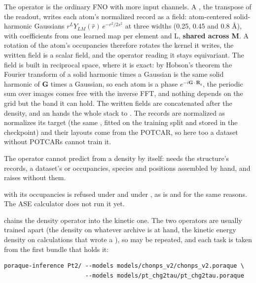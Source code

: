 The operator is the ordinary FNO with more input channels. A , the transpose of the  readout, writes each atom's normalized record as a field: atom-centered solid-harmonic Gaussians $r^L Y_{LM}(\hat r)\,e^{-r^2/2s^2}$ at three widths (0.25, 0.45 and 0.8 \AA{}), with coefficients from one learned map per element and L, \textbf{shared across M}. A rotation of the atom's occupancies therefore rotates the kernel it writes, the written field is a scalar field, and the operator reading it stays equivariant. The field is built in reciprocal space, where it is exact: by Hobson's theorem the Fourier transform of a solid harmonic times a Gaussian is the same solid harmonic of $\mathbf G$ times a Gaussian, so each atom is a phase $e^{-i\mathbf G\cdot\mathbf R_a}$, the periodic sum over images comes free with the inverse FFT, and nothing depends on the grid but the band it can hold. The  written fields are concatenated after the density, and an  hands the whole stack to . The records are normalized as  normalizes its target (the same , fitted on the training split and stored in the checkpoint) and their layouts come from the POTCAR, so here too a dataset without POTCARs cannot train it.

The operator cannot predict from a density by itself:  needs the structure's records, a dataset's  or occupancies, species and positions assembled by hand, and raises without them.

\begin{pwarn}
 with its occupancies is refused under  and under , as  is and for the same reasons. The ASE calculator does not run it yet.
\end{pwarn}

 chains the density operator into the kinetic one. The two operators are usually trained apart (the density on whatever archive is at hand, the kinetic energy density on calculations that wrote a ), so  may be repeated, and each task is taken from the first bundle that holds it:

\begin{lstlisting}
poraque-inference Pt2/ --models models/chonps_v2/chonps_v2.poraque \
                       --models models/pt_chg2tau/pt_chg2tau.poraque
\end{lstlisting}

